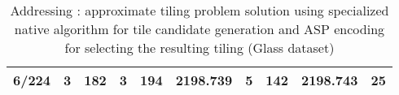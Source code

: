 \begin{table}[]
\begin{tabular}{rrrrrrrrrr}
6/224                                          & 3                                       & 182                                         & 3                      & 194                        & 2198.739                  & 5                                           & 142                                             & 2198.743                                       & 25  \\ \hline                                                 
\end{tabular}
\caption{Addressing \qsix: approximate tiling problem solution using specialized native algorithm for tile candidate generation and ASP encoding for selecting the resulting tiling (Glass dataset)}
\label{til:glass}
\normalsize
\end{table}

